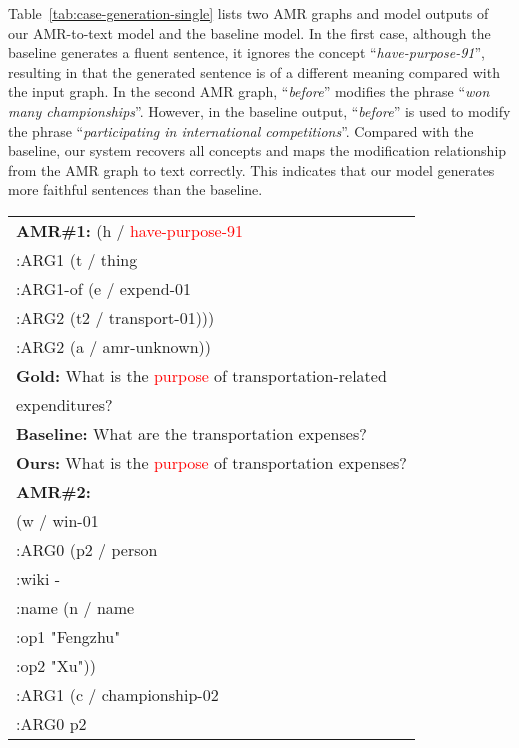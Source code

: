 \documentclass[11pt]{article}
\begin{document}
Table~\ref{tab:case-generation-single} lists two AMR graphs and model outputs of our AMR-to-text model and the baseline model.
In the first case, although the baseline generates a fluent sentence, it ignores the concept ``\textit{have-purpose-91}'', resulting in that the generated sentence is of a different meaning compared with the input graph.
In the second AMR graph, ``\textit{before}'' modifies the phrase ``\textit{won many championships}''. 
However, in the baseline output, ``\textit{before}'' is used to modify the phrase ``\textit{participating in international competitions}''.
Compared with the baseline, our system recovers all concepts and maps the modification relationship from the AMR graph to text correctly.
This indicates that our model generates more faithful sentences than the baseline.
\begin{table}[!t]
    \centering
    \small
    \begin{tabular}{l}
        \toprule
        \textbf{AMR\#1:} (h / \textcolor{red}{have-purpose-91} \\
        \quad\quad :ARG1 (t / thing \\
        \quad\quad\quad    :ARG1-of (e / expend-01 \\
        \quad\quad\quad\quad :ARG2 (t2 / transport-01))) \\
        \quad\quad :ARG2 (a / amr-unknown)) \\
        \midrule
        \textbf{Gold:} What is the \textcolor{red}{purpose} of transportation-related \\ \quad\quad expenditures?  \\
\textbf{Baseline:}  What are the transportation  expenses?\\
\textbf{Ours:} What is the \textcolor{red}{purpose} of
        transportation expenses?\\
        \midrule
        \midrule
        \textbf{AMR\#2:} \\
        \quad (w / win-01 \\
        \quad\quad :ARG0 (p2 / person \\ 
        \quad\quad\quad:wiki - \\ 
        \quad\quad\quad:name (n / name \\
        \quad\quad\quad\quad:op1 "Fengzhu" \\
        \quad\quad\quad\quad:op2 "Xu")) \\
        \quad\quad :ARG1 (c / championship-02 \\
        \quad\quad\quad :ARG0 p2 \\

\end{tabular}
\end{table}
\end{document}

